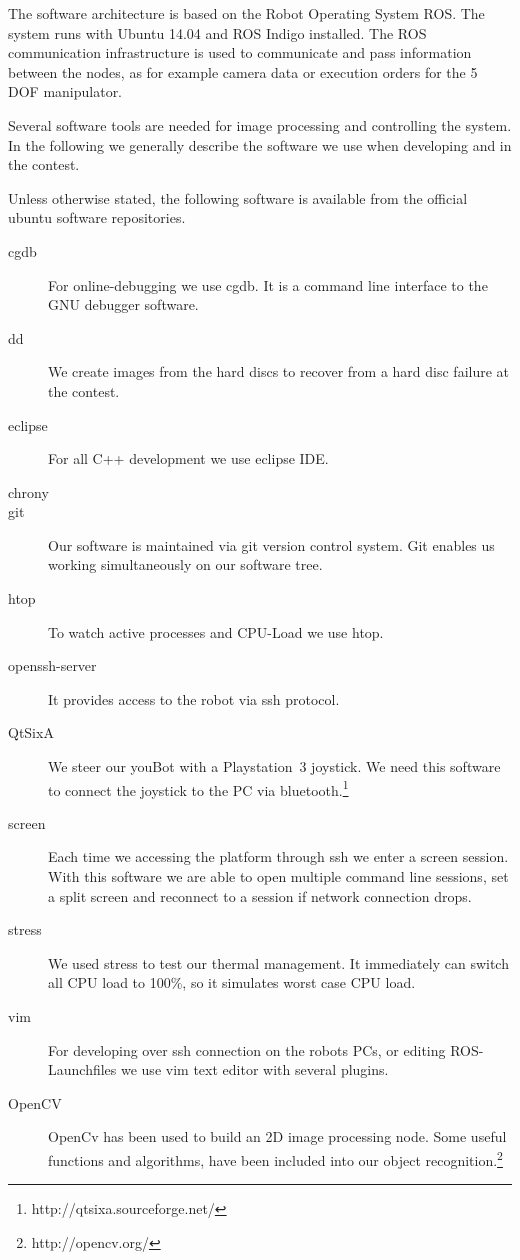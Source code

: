 The software architecture is based on the Robot Operating System ROS. The system runs with Ubuntu 14.04 and ROS Indigo installed. The ROS communication infrastructure is used to communicate and pass information between the nodes, as for example camera data or execution orders for the 5 DOF manipulator. 

Several software tools are needed for image processing and controlling the system. In the following we generally describe the software we use when developing and in the contest.

Unless otherwise stated, the following software is available from the official ubuntu software repositories.

\begin{description}
	\item [cgdb] For online-debugging we use cgdb. It is a command line interface to the GNU debugger software. 
	\item [dd] We create images from the hard discs to recover from a hard disc failure at the contest.
	\item [eclipse] For all C++ development we use eclipse IDE. 
	\item [chrony] 
	\item [git] Our software is maintained via git version  control system. Git enables us working simultaneously on our software tree.  
	\item [htop] To watch active processes and CPU-Load we use htop. 
	\item [openssh-server] It provides access to the robot via ssh protocol. 
	\item [QtSixA] We steer our youBot with a Playstation~3 joystick. We need this software to connect the joystick to the PC via bluetooth.\footnote{http://qtsixa.sourceforge.net/}
	\item  [screen] Each time we accessing the platform through ssh we enter a screen session. With this software we are able to open multiple command line sessions, set a split screen and reconnect to a session if network connection drops. 
	\item [stress] We used stress to test our thermal management. It immediately can switch all CPU load to 100\%, so it simulates worst case CPU load. 
	\item [vim] For developing over ssh connection on the robots PCs, or editing ROS-Launchfiles we use vim text editor with several plugins.
	\item [OpenCV] OpenCv has been used to build an 2D image processing node. Some useful functions and algorithms, have been included into our object recognition.\footnote{http://opencv.org/}
\end{description}

